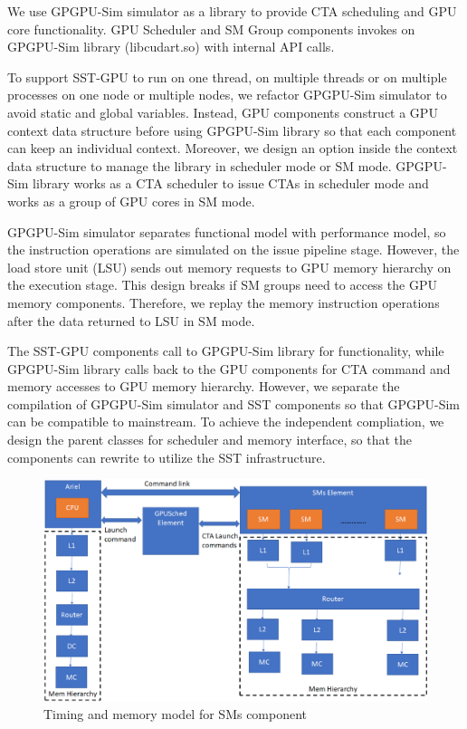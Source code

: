 We use GPGPU-Sim simulator as a library to provide CTA scheduling and GPU core
functionality. GPU Scheduler and SM Group components invokes on GPGPU-Sim library
(libcudart.so) with internal API calls.

To support SST-GPU to run on one thread, on multiple threads or on multiple
processes on one node or multiple nodes, we refactor GPGPU-Sim simulator to avoid
static and global variables. Instead, GPU components construct a GPU context data
structure before using GPGPU-Sim library so that each component can keep an
individual context. Moreover, we design an option inside the context data structure
to manage the library in scheduler mode or SM mode. GPGPU-Sim library works as
a CTA scheduler to issue CTAs in scheduler mode and works as a group of GPU cores in SM mode.

GPGPU-Sim simulator separates functional model with performance model, so the
instruction operations are simulated on the issue pipeline stage. However, the load store
unit (LSU) sends out memory requests to GPU memory hierarchy on the execution stage.
This design breaks if SM groups need to access the GPU memory components.
Therefore, we replay the memory instruction operations after the data returned
to LSU in SM mode.

The SST-GPU components call to GPGPU-Sim library for functionality, while
GPGPU-Sim library calls back to the GPU components for CTA command and
memory accesses to GPU memory hierarchy. However, we separate the compilation
of GPGPU-Sim simulator and SST components so that GPGPU-Sim can be compatible
to mainstream. To achieve the independent compliation, we design the parent
classes for scheduler and memory interface, so that the components can rewrite
to utilize the SST infrastructure.

   \begin{figure}[!htb]
      \centering
      \setlength{\abovecaptionskip}{6pt plus 1pt minus 1pt}
      \includegraphics[width=.90\textwidth,keepaspectratio]{figures/3_1.eps}
      \captionsetup{width=.75\textwidth}
      \caption{Timing and memory model for SMs component}
      \label{fig:gpu_mem_model}
   \end{figure}
